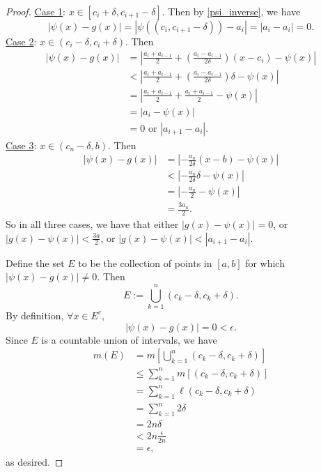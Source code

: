 \documentclass{article}
\begin{document}
\begin{proof}
	\underline{Case 1}: $x \in [c_i + \delta, c_{i+1} - \delta]$. Then by \eqref{psi_inverse}, we have
	\begin{equation}
		|\psi(x) - g(x)| = |\psi\left((c_i, c_{i+1}-\delta)\right) - a_i| = |a_i - a_i| = 0.
	\end{equation}
	\underline{Case 2}: $x \in (c_i - \delta, c_i + \delta)$. Then
	\begin{align}
		|\psi(x) - g(x)| &= \left|\frac{a_i + a_{i-1}}{2} + \left(\frac{a_i - a_{i-1}}{2\delta}\right)(x-c_i) - \psi(x)\right| \\
		&< \left|\frac{a_i + a_{i-1}}{2} + \left(\frac{a_i - a_{i-1}}{2\delta}\right)\delta - \psi(x)\right| \\
		&= \left|\frac{a_i + a_{i-1}}{2} + \frac{a_i + a_{i-1}}{2} - \psi(x)\right| \\
		&= |a_i - \psi(x)| \\
		&= 0 \textrm{ or } |a_{i+1} - a_i|.
	\end{align}
	\underline{Case 3}: $x \in (c_n - \delta, b)$. Then
	\begin{align}
		|\psi(x) - g(x)| &= \left|-\frac{a_n}{2\delta}(x-b) - \psi(x)\right| \\
		&< \left|-\frac{a_n}{2\delta}\delta - \psi(x)\right| \\
		&= \left|-\frac{a_n}{2} - \psi(x)\right| \\
		&= \frac{3a_n}{2}.
	\end{align}
	So in all three cases, we have that either $|g(x) - \psi(x)| = 0$, or $|g(x) - \psi(x)| < \frac{3a}{2}$, or $|g(x) - \psi(x)|< |a_{i+1} - a_i|$.
	
	Define the set $E$ to be the collection of points in $[a, b]$ for which $|\psi(x) - g(x)| \neq 0$. Then
	\begin{equation}
		E := \bigcup_{k=1}^{n} (c_k - \delta, c_k + \delta).
	\end{equation}
	By definition, $\forall x \in E^c$, 
	\begin{equation}
		|\psi(x) - g(x)| = 0 < \epsilon.
	\end{equation}
	Since $E$ is a countable union of intervals, we have
	\begin{align}
		m(E) &= m\left[\bigcup_{k=1}^n (c_k - \delta, c_k + \delta)\right] \\
		&\leq \sum_{k=1}^n m\left[(c_k - \delta, c_k + \delta)\right] \\
		&= \sum_{k=1}^n \ell (c_k - \delta, c_k + \delta) \\
		&= \sum_{k=1}^n 2\delta\\
		&= 2n\delta \\
		& < 2n \frac{\epsilon}{2n} \\
		&= \epsilon,
	\end{align}
	as desired.
\end{proof}
\end{document}
